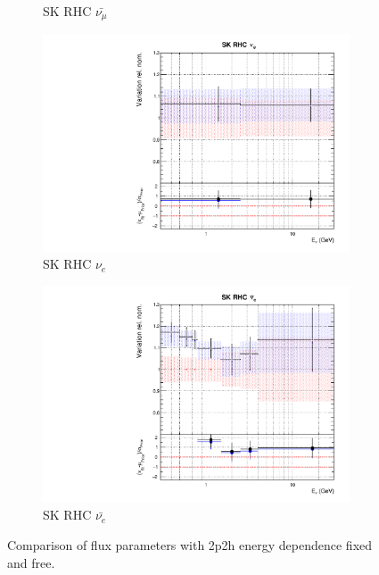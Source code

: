 \begin{figure}
\begin{subfigure}{0.24\textwidth}
  \caption{SK RHC $\bar{\nu_{\mu}}$}
\end{subfigure}
\begin{subfigure}{0.24\textwidth}
  \centering
  \includegraphics[width=0.95\linewidth]{figs/fixed2p2hflux14}
  \caption{SK RHC $\nu_{e}$}
\end{subfigure}
\begin{subfigure}{0.24\textwidth}
  \centering
  \includegraphics[width=0.95\linewidth]{figs/fixed2p2hflux15}
  \caption{SK RHC $\bar{\nu_e}$}
\end{subfigure}
\caption{Comparison of flux parameters with 2p2h energy dependence fixed and free.}
\label{fig:fixed2p2hflux}
\end{figure}

